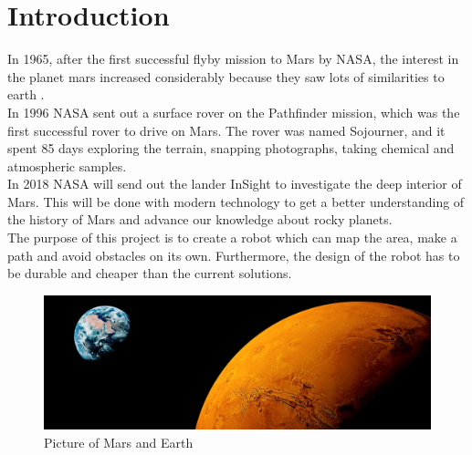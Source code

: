 \chapter{Introduction}\label{ch:introduction}

In 1965, after the first successful flyby mission to Mars by NASA, the interest in the planet mars increased considerably because they saw lots of similarities to earth \cite{NASAChronology}.\\
In 1996 NASA sent out a surface rover on the Pathfinder mission, which was the first successful rover to drive on Mars. The rover was named Sojourner, and it spent 85 days exploring the terrain, snapping photographs, taking chemical and atmospheric samples\cite{NASASojournerPathfinder}\cite{NASAChronology}.\\
In 2018 NASA will send out the lander InSight to investigate the deep interior of Mars. This will be done with modern technology to get a better understanding of the history of Mars and advance our knowledge about rocky planets\cite{InSight}.\\

The purpose of this project is to create a robot which can map the area, make a path and avoid obstacles on its own. Furthermore, the design of the robot has to be durable and cheaper than the current solutions.\\


\begin{figure}[h]
    \centering
    \includegraphics[width=\linewidth]{figures/639620382-mars.jpg}
    \caption{Picture of Mars and Earth\cite{MarsPics}}
    \label{fig:marsSeasons}
\end{figure}


